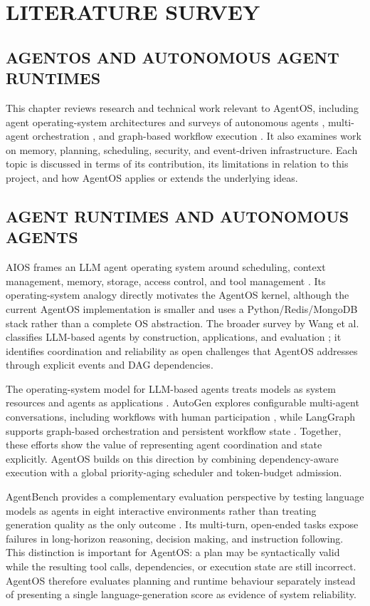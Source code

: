 \chapter{\uppercase{Literature Survey}}
\label{ch:survey}

\section{\uppercase{AgentOS and Autonomous Agent Runtimes}}
This chapter reviews research and technical work relevant to AgentOS, including agent operating-system architectures and surveys of autonomous agents \cite{mei2024aios,wang2024survey}, multi-agent orchestration \cite{wu2023autogen}, and graph-based workflow execution \cite{langgraphdocs}. It also examines work on memory, planning, scheduling, security, and event-driven infrastructure. Each topic is discussed in terms of its contribution, its limitations in relation to this project, and how AgentOS applies or extends the underlying ideas.

\section{\uppercase{Agent Runtimes and Autonomous Agents}}
AIOS frames an LLM agent operating system around scheduling, context management, memory, storage, access control, and tool management \cite{mei2024aios}. Its operating-system analogy directly motivates the AgentOS kernel, although the current AgentOS implementation is smaller and uses a Python/Redis/MongoDB stack rather than a complete OS abstraction. The broader survey by Wang et al. classifies LLM-based agents by construction, applications, and evaluation \cite{wang2024survey}; it identifies coordination and reliability as open challenges that AgentOS addresses through explicit events and DAG dependencies.

The operating-system model for LLM-based agents treats models as system resources and agents as applications \cite{liu2023llmos}. AutoGen explores configurable multi-agent conversations, including workflows with human participation \cite{wu2023autogen}, while LangGraph supports graph-based orchestration and persistent workflow state \cite{langgraphdocs}. Together, these efforts show the value of representing agent coordination and state explicitly. AgentOS builds on this direction by combining dependency-aware execution with a global priority-aging scheduler and token-budget admission.

AgentBench provides a complementary evaluation perspective by testing language models as agents in eight interactive environments rather than treating generation quality as the only outcome \cite{liu2023agentbench}. Its multi-turn, open-ended tasks expose failures in long-horizon reasoning, decision making, and instruction following. This distinction is important for AgentOS: a plan may be syntactically valid while the resulting tool calls, dependencies, or execution state are still incorrect. AgentOS therefore evaluates planning and runtime behaviour separately instead of presenting a single language-generation score as evidence of system reliability.

